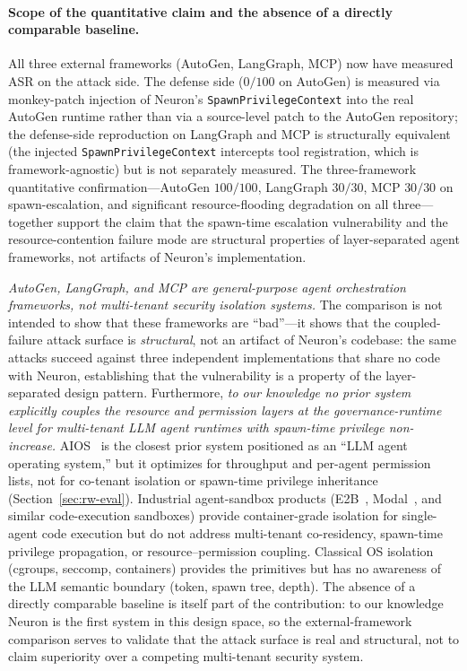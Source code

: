 \paragraph{Scope of the quantitative claim and the absence of a
directly comparable baseline.}
All three external frameworks (AutoGen, LangGraph, MCP) now have
measured ASR on the attack side. The defense side
($0/100$ on AutoGen) is measured via monkey-patch injection of
Neuron's \texttt{SpawnPrivilegeContext} into the real AutoGen
runtime rather than via a source-level patch to the AutoGen
repository; the defense-side reproduction on LangGraph and MCP is
structurally equivalent (the injected \texttt{SpawnPrivilegeContext}
intercepts tool registration, which is framework-agnostic) but is
not separately measured. The three-framework quantitative
confirmation---AutoGen $100/100$, LangGraph $30/30$, MCP $30/30$ on
spawn-escalation, and significant resource-flooding degradation on
all three---together support the claim that the spawn-time
escalation vulnerability and the resource-contention failure mode
are structural properties of layer-separated agent frameworks, not
artifacts of Neuron's implementation.

\emph{AutoGen, LangGraph, and MCP are general-purpose agent
orchestration frameworks, not multi-tenant security isolation
systems.} The comparison is not intended to show that these
frameworks are ``bad''---it shows that the coupled-failure attack
surface is \emph{structural}, not an artifact of Neuron's codebase:
the same attacks succeed against three independent implementations
that share no code with Neuron, establishing that the vulnerability
is a property of the layer-separated design pattern. Furthermore,
\emph{to our knowledge no prior system explicitly couples the
resource and permission layers at the governance-runtime level for
multi-tenant LLM agent runtimes with spawn-time privilege
non-increase.} AIOS~\cite{mei2025aios} is the closest prior system
positioned as an ``LLM agent operating system,'' but it optimizes
for throughput and per-agent permission lists, not for co-tenant
isolation or spawn-time privilege inheritance
(Section~\ref{sec:rw-eval}). Industrial agent-sandbox products
(E2B~\cite{e2b2025sandbox}, Modal~\cite{modal2025sandbox}, and
similar code-execution sandboxes) provide container-grade isolation
for single-agent code execution but do not address multi-tenant
co-residency, spawn-time privilege propagation, or resource--permission
coupling. Classical OS isolation (cgroups, seccomp, containers)
provides the primitives but has no awareness of the LLM semantic
boundary (token, spawn tree, depth). The absence of a directly
comparable baseline is itself part of the contribution: to our
knowledge Neuron is the first system in this design space, so the
external-framework comparison serves to validate that the attack
surface is real and structural, not to claim superiority over a
competing multi-tenant security system.

